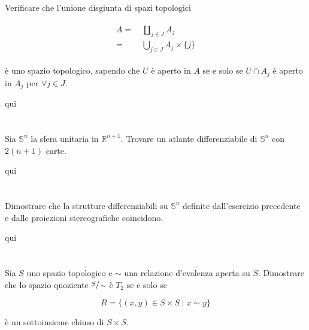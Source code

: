 \begin{tcolorbox}
	Verificare che l'unione disgiunta di spazi topologici
	
	\begin{align}
		\begin{split}
			A =& \, \coprod_{j \in J} A_{j}\\
			=& \, \bigcup_{j \in J} A_{j} \times \{j\}
		\end{split}
	\end{align}
	
	è uno spazio topologico, sapendo che $ U $ è aperto in $ A $ se e solo se $ U \cap A_{j} $ è aperto in $ A_{j} $ per $ \forall j \in J $.
\end{tcolorbox}

qui

\tocless\section{}\label{es2-1}

\begin{tcolorbox}
	Sia $ \mathbb{S}^{n} $ la sfera unitaria in $ \mathbb{R}^{n+1} $. Trovare un atlante differenziabile di $ \mathbb{S}^{n} $ con $ 2(n+1) $ carte.

\end{tcolorbox}

qui

\tocless\section{}\label{es2-2}

\begin{tcolorbox}
	Dimostrare che la strutture differenziabili su $ \mathbb{S}^{n} $ definite dall’esercizio precedente e dalle proiezioni
	stereografiche coincidono.
\end{tcolorbox}

qui

\tocless\section{}\label{es2-3}

\begin{tcolorbox}
	Sia $ S $ uno spazio topologico e $ \sim $ una relazione d'evalenza aperta su $ S $. Dimostrare che lo spazio quoziente $ \sfrac{S}{\sim} $ è $ T_{2} $ se e solo se
	
	\begin{equation}
		R = \{ (x,y) \in S \times S \mid x \sim y \}
	\end{equation}
	
	è un sottoinsieme chiuso di $ S \times S $.
\end{tcolorbox}

